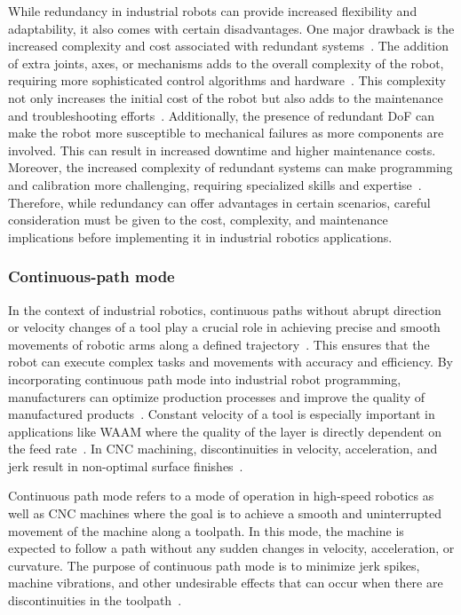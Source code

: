While redundancy in industrial robots can provide increased flexibility and adaptability, it also comes with certain disadvantages. One major drawback is the increased complexity and cost associated with redundant systems~\cite{Halevi.2011}. The addition of extra joints, axes, or mechanisms adds to the overall complexity of the robot, requiring more sophisticated control algorithms and hardware~\cite{Duong.2021}. This complexity not only increases the initial cost of the robot but also adds to the maintenance and troubleshooting efforts~\cite{Ahangar.2019}. Additionally, the presence of redundant DoF can make the robot more susceptible to mechanical failures as more components are involved. This can result in increased downtime and higher maintenance costs. Moreover, the increased complexity of redundant systems can make programming and calibration more challenging, requiring specialized skills and expertise~\cite{Erdos.2016}. Therefore, while redundancy can offer advantages in certain scenarios, careful consideration must be given to the cost, complexity, and maintenance implications before implementing it in industrial robotics applications.




\subsubsection{Continuous-path mode}\label{CPM}
In the context of industrial robotics, continuous paths without abrupt direction or velocity changes of a tool play a crucial role in achieving precise and smooth movements of robotic arms along a defined trajectory~\cite{Jia.2018}. This ensures that the robot can execute complex tasks and movements with accuracy and efficiency. By incorporating continuous path mode into industrial robot programming, manufacturers can optimize production processes and improve the quality of manufactured products~\cite{Zhang.2020}. Constant velocity of a tool is especially important in applications like WAAM where the quality of the layer is directly dependent on the feed rate~\cite{Li.2018b}. In CNC machining, discontinuities in velocity, acceleration, and jerk result in non-optimal surface finishes~\cite{Sun.2021}.


Continuous path mode refers to a mode of operation in high-speed robotics as well as CNC machines where the goal is to achieve a smooth and uninterrupted movement of the machine along a toolpath. In this mode, the machine is expected to follow a path without any sudden changes in velocity, acceleration, or curvature. The purpose of continuous path mode is to minimize jerk spikes, machine vibrations, and other undesirable effects that can occur when there are discontinuities in the toolpath~\cite{Jia.2018, Yang.2017}.

